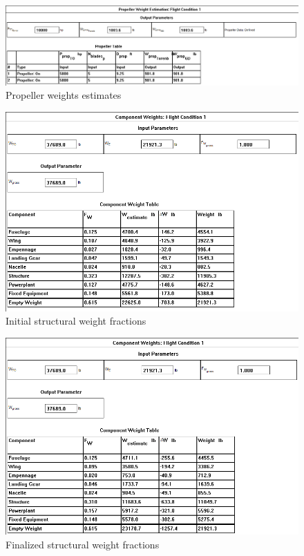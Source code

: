 \documentclass[conf]{new-aiaa}
\begin{document}
\begin{figure}[H]
    \includegraphics[width=\textwidth]{Report3Printouts/Weight/PropellerWeight_cropped.png}
    \caption{Propeller weights estimates}
    \label{fig:propellerweight}
\end{figure}

\begin{figure}[H]
    \includegraphics[width=\textwidth]{Report3Printouts/Weight/WeightFractionsInitial_cropped.png}
    \caption{Initial structural weight fractions}
    \label{fig:weightfractionsinitial}
\end{figure}

\begin{figure}[H]
    \includegraphics[width=\textwidth]{Report3Printouts/Weight/WeightFractionsFinal_cropped.png}
    \caption{Finalized structural weight fractions}
    \label{fig:weightfractionsfinal}
\end{figure}
\end{document}
